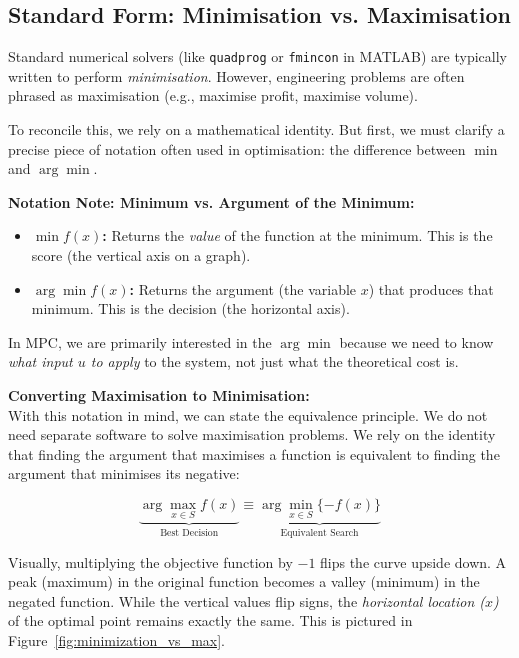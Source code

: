 \subsection{Standard Form: Minimisation vs. Maximisation}

Standard numerical solvers (like \texttt{quadprog} or \texttt{fmincon} in MATLAB) are typically written to perform \emph{minimisation}. However, engineering problems are often phrased as maximisation (e.g., maximise profit, maximise volume).

To reconcile this, we rely on a mathematical identity. But first, we must clarify a precise piece of notation often used in optimisation: the difference between $\min$ and $\arg \min$.

\textbf{Notation Note: Minimum vs. Argument of the Minimum:} \\

\begin{itemize}
	\item \textbf{$\min f(x)$:} Returns the \emph{value} of the function at the minimum. This is the score (the vertical axis on a graph).
	\item \textbf{$\arg \min f(x)$:} Returns the {argument} (the variable $x$) that produces that minimum. This is the decision (the horizontal axis).
\end{itemize}

In MPC, we are primarily interested in the $\arg \min$ because we need to know \textit{what input $u$ to apply} to the system, not just what the theoretical cost is.

\textbf{Converting Maximisation to Minimisation:}\\

With this notation in mind, we can state the equivalence principle. We do not need separate software to solve maximisation problems. We rely on the identity that finding the argument that maximises a function is equivalent to finding the argument that minimises its negative:

\begin{equation}
	\underbrace{\arg \max_{x \in S} f(x)}_{\text{Best Decision}} \equiv \underbrace{\arg \min_{x \in S} \{-f(x)\}}_{\text{Equivalent Search}}
\end{equation}

Visually, multiplying the objective function by $-1$ flips the curve upside down. A peak (maximum) in the original function becomes a valley (minimum) in the negated function. While the vertical values flip signs, the \emph{horizontal location ($x$)} of the optimal point remains exactly the same. This is pictured in Figure~\ref{fig:minimization_vs_max}.

